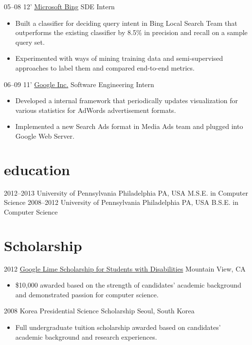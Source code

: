 \documentclass[]{patyoon-cv}
\begin{document}
\begin{entrylist}
{\begin{itemize}
    \end{itemize}
  }
  \entry
  {05–08 12'}
  {\href{http://bing.com/}{Microsoft Bing}}
  {SDE Intern}
  {\begin{itemize}
    \item Built a classifier for deciding query intent in Bing Local Search Team that outperforms the existing classifier by 8.5\% in precision and recall on a sample query set.
    \item Experimented with ways of mining training data and semi-supervised approaches to label them and compared end-to-end metrics.
    \end{itemize}}
  \entry
  {06–09 11'}
  {\href{http://www.google.com}{Google Inc.}}
  {Software Engineering Intern}
  {\begin{itemize}
    \item Developed a internal framework that periodically updates visualization for various statistics for AdWords advertisement formats.
    \item Implemented a new Search Ads format in Media Ads team and plugged into Google Web Server.
    \end{itemize}}
\end{entrylist}

\section{education}

\begin{entrylist}
  \entry
  {2012–2013}
  {University of Pennsylvania}
  {Philadelphia PA, USA}
  {M.S.E. in Computer Science}
  \entry
  {2008–2012}
  {University of Pennsylvania}
  {Philadelphia PA, USA}
  {B.S.E. in Computer Science}
\end{entrylist}

\section{Scholarship}

\begin{entrylist}
  \entry
  {2012} {\href{http://www.limeconnect.com/opportunities/page/google-lime-scholarship-program}
    {Google Lime Scholarship for Students with Disabilities}}
  {Mountain View, CA}
  {\begin{itemize}
    \item \$10,000 awarded based on the strength of candidates' academic background and demonstrated passion for computer science.
    \end{itemize}
  }
  \entry
  {2008}
  {Korea Presidential Science Scholarship}
  {Seoul, South Korea}
  {\begin{itemize}
    \item Full undergraduate tuition scholarship awarded based on candidates' academic background and research experiences.
    \end{itemize}
  }
\end{entrylist}
\end{document}
